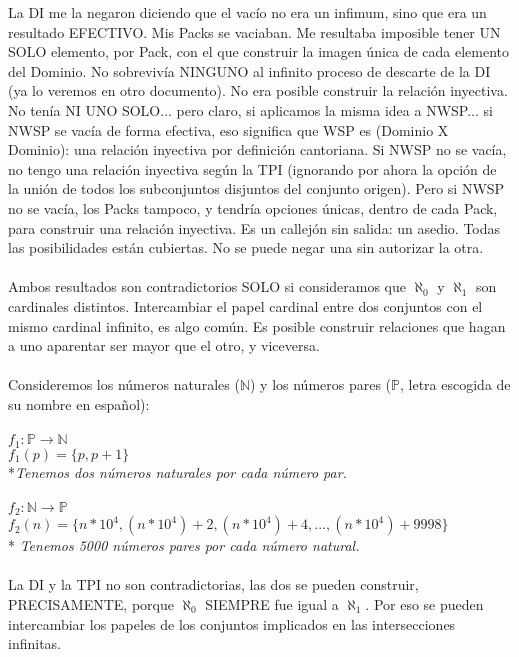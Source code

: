 	\noindent
	La DI me la negaron diciendo que el vacío no era un infimum, sino que era un resultado EFECTIVO. Mis Packs se vaciaban. Me resultaba imposible tener UN SOLO elemento, por Pack, con el que construir la imagen única de cada elemento del Dominio. No sobrevivía NINGUNO al infinito proceso de descarte de la DI (ya lo veremos en otro documento). No era posible construir la relación inyectiva. No tenía NI UNO SOLO... pero claro, si aplicamos la misma idea a NWSP... si NWSP se vacía de forma efectiva, eso significa que WSP es (Dominio X Dominio): una relación inyectiva por definición cantoriana. Si NWSP no se vacía, no tengo una relación inyectiva según la TPI (ignorando por ahora la opción de la unión de todos los subconjuntos disjuntos del conjunto origen). Pero si NWSP no se vacía, los Packs tampoco, y tendría opciones únicas, dentro de cada Pack, para construir una relación inyectiva. Es un callejón sin salida: un asedio. Todas las posibilidades están cubiertas. No se puede negar una sin autorizar la otra.\\\\
	
	\noindent
	Ambos resultados son contradictorios SOLO si consideramos que $\aleph_{0}$ y $\aleph_{1}$ son cardinales distintos. Intercambiar el papel cardinal entre dos conjuntos con el mismo cardinal infinito, es algo común. Es posible construir relaciones que hagan a uno aparentar ser mayor que el otro, y viceversa.\\\\
	
	\noindent
	Consideremos los números naturales ($\mathbb{N}$) y los números pares ($\mathbb{P}$, letra escogida de su nombre en español):\\\\
	$f_{1}: \mathbb{P} \longrightarrow \mathbb{N}$\\
	$f_{1}(p) = \{p, p+1\}$\\
	*\textit{Tenemos dos números naturales por cada número par.}\\\\
	$f_{2}: \mathbb{N} \longrightarrow \mathbb{P}$\\
	$f_{2}(n) = \{n*10^{4}, (n*10^{4})+2, (n*10^{4})+4, ... , (n*10^{4})+9998 \}$\\
	* \textit{Tenemos 5000 números pares por cada número natural.}\\\\
	
	\noindent
	La DI y la TPI no son contradictorias, las dos se pueden construir, PRECISAMENTE, porque $\aleph_{0}$ SIEMPRE fue igual a $\aleph_{1}$. Por eso se pueden intercambiar los papeles de los conjuntos implicados en las intersecciones infinitas.\\\\
	
